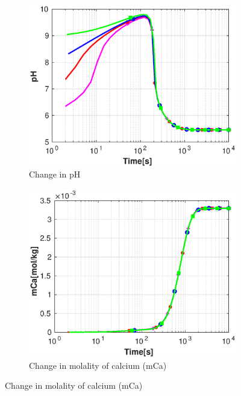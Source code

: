 \begin{figure}[!h]
        \centering
    \begin{subfigure}{.5\linewidth}
            \centering
        \includegraphics[width=\textwidth]{PICTURES/with_pH_pH.eps}
        \caption{Change in pH}
        \label{fig:pHpH}
    \end{subfigure}%
        \hfill
    \begin{subfigure}{.5\linewidth}
            \centering
        \includegraphics[width=\textwidth]{PICTURES/with_pH_mCa.eps}
        \caption{Change in molality of calcium (mCa)}
        \label{fig:pHmCa}
    \end{subfigure}%

\end{figure}
